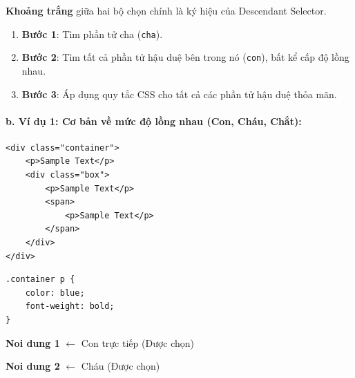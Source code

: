 \documentclass[11pt,oneside]{book}
\newcommand{\codeinline}[1]{\textcolor{accentOrange}{\texttt{#1}}}
\begin{document}
\begin{noteBox}
\textbf{Khoảng trắng} giữa hai bộ chọn chính là ký hiệu của Descendant Selector.
\begin{enumerate}[leftmargin=1.5em, itemsep=2pt, parsep=0pt]
    \item \textbf{Bước 1}: Tìm phần tử cha (\codeinline{cha}).
    \item \textbf{Bước 2}: Tìm tất cả phần tử hậu duệ bên trong nó (\codeinline{con}), bất kể cấp độ lồng nhau.
    \item \textbf{Bước 3}: Áp dụng quy tắc CSS cho tất cả các phần tử hậu duệ thỏa mãn.
\end{enumerate}
\end{noteBox}

\paragraph{b. Ví dụ 1: Cơ bản về mức độ lồng nhau (Con, Cháu, Chắt):}
\begin{codeWindow}
\begin{lstlisting}[language=HTML5]
<div class="container">
    <p>Sample Text</p>
    <div class="box">
        <p>Sample Text</p>
        <span>
            <p>Sample Text</p>
        </span>
    </div>
</div>
\end{lstlisting}

\begin{lstlisting}[language=CSS3]
.container p {
    color: blue;
    font-weight: bold;
}
\end{lstlisting}
\end{codeWindow}

\begin{browserWindow}
\sffamily\small
\begin{tcolorbox}[arc=2pt, colback=primaryBlue!5, colframe=primaryBlue!40, boxrule=1pt, title={\sffamily\small\color{white}\textbf{.container}}, colbacktitle=primaryBlue!70]
\textcolor{primaryBlue}{\textbf{Noi dung 1}} {\small\textcolor{gray!60}{$\leftarrow$ Con trực tiếp (Được chọn)}} \par\vspace{3pt}
\begin{tcolorbox}[arc=2pt, colback=white, colframe=primaryBlue!30, boxrule=1pt, title={\sffamily\scriptsize\color{darkText}.box}]
\textcolor{primaryBlue}{\textbf{Noi dung 2}} {\small\textcolor{gray!60}{$\leftarrow$ Cháu (Được chọn)}} \par\vspace{2pt}
\end{tcolorbox}
\end{tcolorbox}
\end{browserWindow}
\end{document}
